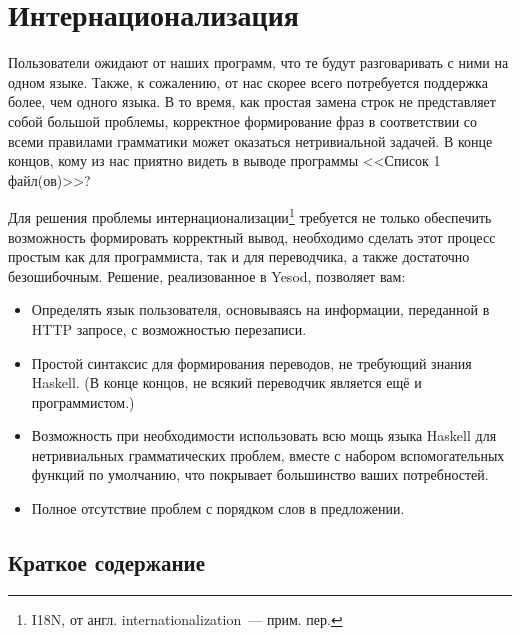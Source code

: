 \chapter{Интернационализация}\label{chap:i18n}

Пользователи ожидают от наших программ, что те будут разговаривать с ними на
одном языке. Также, к сожалению, от нас скорее всего потребуется поддержка
более, чем одного языка. В то время, как простая замена строк не представляет
собой большой проблемы, корректное формирование фраз в соответствии со всеми
правилами грамматики может оказаться нетривиальной задачей. В конце концов,
кому из нас приятно видеть в выводе программы <<Список 1 файл(ов)>>?

Для решения проблемы интернационализации\footnote{I18N, от англ.
    internationalization~--- прим. пер.} требуется не только обеспечить
возможность формировать корректный вывод, необходимо сделать этот процесс
простым как для программиста, так и для переводчика, а также достаточно
безошибочным. Решение, реализованное в Yesod, позволяет вам:

\begin{itemize}
  \item Определять язык пользователя, основываясь на информации, переданной в
      HTTP запросе, с возможностью перезаписи.

  \item Простой синтаксис для формирования переводов, не требующий знания
      Haskell. (В конце концов, не всякий переводчик является ещё и
      программистом.)

  \item Возможность при необходимости использовать всю мощь языка Haskell для
      нетривиальных грамматических проблем, вместе с набором вспомогательных
      функций по умолчанию, что покрывает большинство ваших потребностей.

  \item Полное отсутствие проблем с порядком слов в предложении.
\end{itemize}

\section{Краткое содержание}




